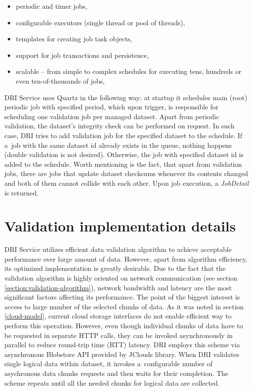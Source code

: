 \begin{itemize}
\item periodic and timer jobs,
\item configurable executors (single thread or pool of threads),
\item templates for creating job task objects,
\item support for job transactions and persistence, 
\item scalable -- from simple to complex schedules for executing tens, hundreds 
or even ten-of-thousands of jobs,
\end{itemize}

DRI Service uses Quartz in the following way: at startup it schedules main (root)
periodic job with specified period, which upon trigger, is responsible for scheduling
one validation job per managed dataset. Apart from periodic validation, the dataset's 
integrity check can be performed on request. In such case, DRI tries to add validation
job for the specified dataset to the schedule. If a~job with the same dataset id
already exists in the queue, nothing happens (double validation is not desired). Otherwise, 
the job with specified dataset id is added to the schedule. Worth mentioning is the fact,
that apart from validation jobs, there are jobs that update dataset checksums whenever its
contents changed and both of them cannot collide with each other. Upon job execution, a
\textit{JobDetail} is returned.

\section{Validation implementation details}
DRI Service utilizes efficient data validation algorithm to achieve acceptable
performance over large amount of data. However, apart from algorithm
efficiency, its optimized implementation is greatly desirable. Due to the fact
that the validation algorithm is highly oriented on network communication (see
section \ref{section:validation-algorithm}), network bandwidth and latency are
the most significant factors affecting its performance. The point of the
biggest interest is access to large number of the selected chunks of data. As
it was noted in section \ref{cloud-model}, current cloud storage interfaces do
not enable efficient way to perform this operation. However, even though
individual chunks of data have to be requested in separate HTTP calls, they can
be invoked asynchronously in parallel to reduce round-trip time (RTT) latency.
DRI employs this scheme via asynchronous Blobstore API provided by JClouds
library. When DRI validates single logical data within dataset, it invokes
a~configurable number of asychronous data chunks requests and then waits for
their completion. The scheme repeats until all the needed chunks for logical
data are collected.\\


